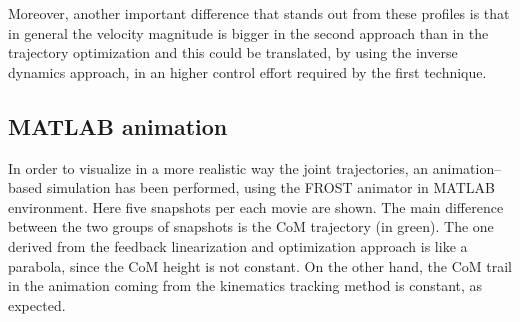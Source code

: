 \documentclass[11pt]{article}
\begin{document}
Moreover, another important difference that stands out from these profiles is that in general the velocity magnitude is bigger in the second approach than in the trajectory optimization and this could be translated, by using the inverse dynamics approach, in an higher control effort required by the first technique.

\subsection{MATLAB animation}

In order to visualize in a more realistic way the joint trajectories, an animation--based simulation has been performed, using the FROST animator in MATLAB environment. Here five snapshots per each movie are shown. The main difference between the two groups of snapshots is the CoM trajectory (in green). The one derived from the feedback linearization and optimization approach is like a parabola, since the CoM height is not constant. On the other hand, the CoM trail in the animation coming from the kinematics tracking method is constant, as expected. 
\end{document}
